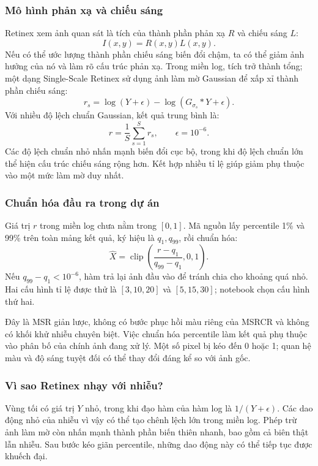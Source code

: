 \subsubsection{Mô hình phản xạ và chiếu sáng}
Retinex xem ảnh quan sát là tích của thành phần phản xạ $R$ và chiếu sáng $L$:
\begin{equation}
I(x,y)=R(x,y)L(x,y).
\end{equation}
Nếu có thể ước lượng thành phần chiếu sáng biến đổi chậm, ta có thể giảm ảnh hưởng của nó và làm rõ cấu trúc phản xạ. Trong miền log, tích trở thành tổng; một dạng Single-Scale Retinex sử dụng ảnh làm mờ Gaussian để xấp xỉ thành phần chiếu sáng:
\begin{equation}
r_s=\log(Y+\epsilon)-\log(G_{\sigma_s}*Y+\epsilon).
\end{equation}
Với nhiều độ lệch chuẩn Gaussian, kết quả trung bình là:
\begin{equation}
r=\frac{1}{S}\sum_{s=1}^{S}r_s,\qquad \epsilon=10^{-6}.
\label{eq:msr}
\end{equation}
Các độ lệch chuẩn nhỏ nhấn mạnh biến đổi cục bộ, trong khi độ lệch chuẩn lớn thể hiện cấu trúc chiếu sáng rộng hơn. Kết hợp nhiều tỉ lệ giúp giảm phụ thuộc vào một mức làm mờ duy nhất.

\subsubsection{Chuẩn hóa đầu ra trong dự án}
Giá trị $r$ trong miền log chưa nằm trong $[0,1]$. Mã nguồn lấy percentile 1\% và 99\% trên toàn mảng kết quả, ký hiệu là $q_1,q_{99}$, rồi chuẩn hóa:
\begin{equation}
\widehat{X}=\operatorname{clip}\!\left(\frac{r-q_1}{q_{99}-q_1},0,1\right).
\label{eq:retinexnorm}
\end{equation}
Nếu $q_{99}-q_1<10^{-6}$, hàm trả lại ảnh đầu vào để tránh chia cho khoảng quá nhỏ. Hai cấu hình tỉ lệ được thử là $[3,10,20]$ và $[5,15,30]$; notebook chọn cấu hình thứ hai.

Đây là MSR giản lược, không có bước phục hồi màu riêng của MSRCR và không có khối khử nhiễu chuyên biệt. Việc chuẩn hóa percentile làm kết quả phụ thuộc vào phân bố của chính ảnh đang xử lý. Một số pixel bị kéo đến 0 hoặc 1; quan hệ màu và độ sáng tuyệt đối có thể thay đổi đáng kể so với ảnh gốc.

\subsubsection{Vì sao Retinex nhạy với nhiễu?}
Vùng tối có giá trị $Y$ nhỏ, trong khi đạo hàm của hàm log là $1/(Y+\epsilon)$. Các dao động nhỏ của nhiễu vì vậy có thể tạo chênh lệch lớn trong miền log. Phép trừ ảnh làm mờ còn nhấn mạnh thành phần biến thiên nhanh, bao gồm cả biên thật lẫn nhiễu. Sau bước kéo giãn percentile, những dao động này có thể tiếp tục được khuếch đại.

